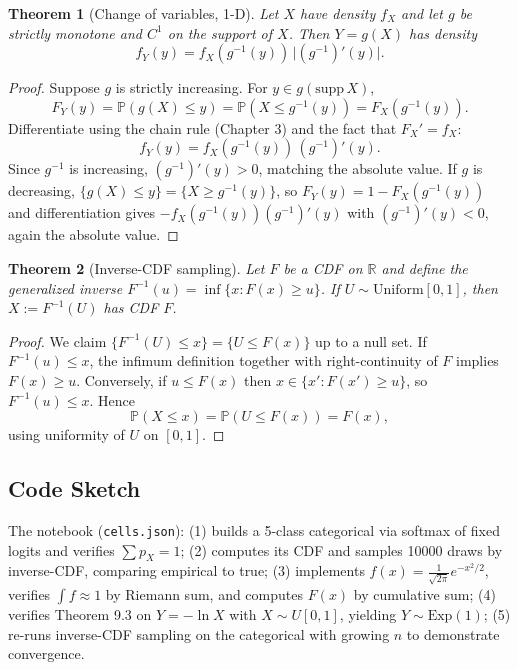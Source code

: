 \documentclass[11pt]{article}
\newtheorem{theorem}{Theorem}[section]
\theoremstyle{remark}
\begin{document}
\begin{theorem}[Change of variables, 1-D]
Let $X$ have density $f_X$ and let $g$ be strictly monotone and $C^1$ on the support of $X$. Then $Y = g(X)$ has density
\[
f_Y(y) = f_X(g^{-1}(y))\,\bigl|(g^{-1})'(y)\bigr|.
\]
\end{theorem}

\begin{proof}
Suppose $g$ is strictly increasing. For $y \in g(\text{supp}\, X)$,
\[
F_Y(y) = \mathbb{P}(g(X) \leq y) = \mathbb{P}(X \leq g^{-1}(y)) = F_X(g^{-1}(y)).
\]
Differentiate using the chain rule (Chapter 3) and the fact that $F_X' = f_X$:
\[
f_Y(y) = f_X(g^{-1}(y))\,(g^{-1})'(y).
\]
Since $g^{-1}$ is increasing, $(g^{-1})'(y) > 0$, matching the absolute value. If $g$ is decreasing, $\{g(X) \leq y\} = \{X \geq g^{-1}(y)\}$, so $F_Y(y) = 1 - F_X(g^{-1}(y))$ and differentiation gives $-f_X(g^{-1}(y))(g^{-1})'(y)$ with $(g^{-1})'(y) < 0$, again the absolute value.
\end{proof}

\begin{theorem}[Inverse-CDF sampling]
Let $F$ be a CDF on $\mathbb{R}$ and define the generalized inverse $F^{-1}(u) = \inf\{x : F(x) \geq u\}$. If $U \sim \mathrm{Uniform}[0,1]$, then $X := F^{-1}(U)$ has CDF $F$.
\end{theorem}

\begin{proof}
We claim $\{F^{-1}(U) \leq x\} = \{U \leq F(x)\}$ up to a null set. If $F^{-1}(u) \leq x$, the infimum definition together with right-continuity of $F$ implies $F(x) \geq u$. Conversely, if $u \leq F(x)$ then $x \in \{x' : F(x') \geq u\}$, so $F^{-1}(u) \leq x$. Hence
\[
\mathbb{P}(X \leq x) = \mathbb{P}(U \leq F(x)) = F(x),
\]
using uniformity of $U$ on $[0,1]$.
\end{proof}

\subsection*{Code Sketch}

The notebook (\texttt{cells.json}): (1) builds a 5-class categorical via softmax of fixed logits and verifies $\sum p_X = 1$; (2) computes its CDF and samples 10000 draws by inverse-CDF, comparing empirical to true; (3) implements $f(x) = \tfrac{1}{\sqrt{2\pi}} e^{-x^2/2}$, verifies $\int f \approx 1$ by Riemann sum, and computes $F(x)$ by cumulative sum; (4) verifies Theorem 9.3 on $Y = -\ln X$ with $X \sim U[0,1]$, yielding $Y \sim \mathrm{Exp}(1)$; (5) re-runs inverse-CDF sampling on the categorical with growing $n$ to demonstrate convergence.
\end{document}
